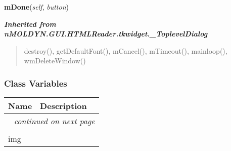     \label{nMOLDYN:GUI:HTMLReader:tkwidget:MfxDialog:mDone}

    \vspace{0.5ex}

\hspace{.8\funcindent}\begin{boxedminipage}{\funcwidth}

    \raggedright \textbf{mDone}(\textit{self}, \textit{button})

\setlength{\parskip}{2ex}
\setlength{\parskip}{1ex}
    \end{boxedminipage}


\large{\textbf{\textit{Inherited from nMOLDYN.GUI.HTMLReader.tkwidget.\_ToplevelDialog}}}

\begin{quote}
destroy(), getDefaultFont(), mCancel(), mTimeout(), mainloop(), wmDeleteWindow()
\end{quote}


  \subsubsection{Class Variables}

    \vspace{-1cm}
\hspace{\varindent}\begin{longtable}{|p{\varnamewidth}|p{\vardescrwidth}|l}
\cline{1-2}
\cline{1-2} \centering \textbf{Name} & \centering \textbf{Description}& \\
\cline{1-2}
\endhead\cline{1-2}\multicolumn{3}{r}{\small\textit{continued on next page}}\\\endfoot\cline{1-2}
\endlastfoot\multicolumn{2}{|l|}{\textit{Inherited from nMOLDYN.GUI.HTMLReader.tkwidget.\_ToplevelDialog}}\\
\multicolumn{2}{|p{\varwidth}|}{\raggedright img}\\
\cline{1-2}
\end{longtable}


